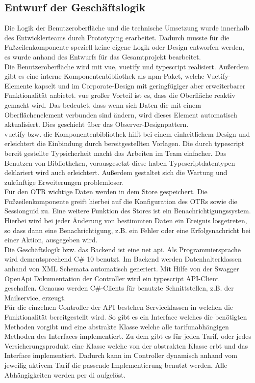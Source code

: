 \subsection{Entwurf der Geschäftslogik}
\label{geschaeftslogik}
Die Logik der Benutzeroberfläche und die technische Umsetzung wurde innerhalb des Entwicklerteams durch Prototyping erarbeitet.
Dadurch musste für die Fußzeilenkomponente speziell keine eigene Logik oder Design entworfen werden, es wurde anhand des Entwurfs für das Gesamtprojekt bearbeitet.\\
Die Benutzeroberfläche wird mit \gls{vue}, \gls{vuetify} und \gls{typescript} realisiert. Außerdem gibt es eine interne Komponentenbibliothek als \gls{npm}-Paket, welche Vuetify-Elemente kapselt und im Corporate-Design mit geringfügiger aber erweiterbarer Funktionalität anbietet. \gls{vue} großer Vorteil ist es, dass die Oberfläche reaktiv gemacht wird. Das bedeutet, dass wenn sich Daten die mit einem Oberflächenelement verbunden sind ändern, wird dieses Element automatisch aktualisiert. Dies geschieht über das Observer-Designpattern.\\
 \gls{vuetify} bzw. die Komponentenbibliothek hilft bei einem einheitlichem Design und erleichtert die Einbindung durch bereitgestellten Vorlagen. Die durch \gls{typescript} bereit gestellte Typsicherheit macht das Arbeiten im Team einfacher. Das Benutzen von Bibliotheken, vorausgesetzt diese haben Typescriptdatentypen deklariert wird auch erleichtert. Außerdem gestaltet sich die Wartung und zukünftige Erweiterungen problemloser.\\
Für den \ac{OTR} wichtige Daten werden in dem Store gespeichert. Die Fußzeilenkomponente greift hierbei auf die Konfiguration des \ac{OTR}s sowie die Sessionguid zu.
Eine weitere Funktion des Stores ist ein Benachrichtigungssystem. Hierbei wird bei jeder Änderung von bestimmten Daten ein Ereignis losgetreten, so dass dann eine Benachrichtigung, z.B. ein Fehler oder eine Erfolgsnachricht bei einer Aktion, ausgegeben wird.\\

Die Geschäftslogik bzw. das Backend ist eine \gls{net} \gls{api}. Als Programmiersprache wird dementsprechend C\# 10 benutzt.
Im Backend werden Datenhalterklassen anhand von XML Schemata automatisch generiert. Mit Hilfe von der Swagger OpenApi Dokumentation der Controller wird ein \gls{typescript} API-Client geschaffen. Genauso werden C\#-Clients für benutzte Schnittstellen, z.B. der Mailservice, erzeugt.\\
Für die einzelnen Controller der API bestehen Serviceklassen in welchen die Funktionalität bereitgestellt wird. So gibt es ein Interface welches die benötigten Methoden vorgibt und eine abstrakte Klasse welche alle tarifunabhängigen Methoden des Interfaces implementiert. Zu dem gibt es für jeden Tarif, oder jedes Versicherungsprodukt eine Klasse welche von der abstrakten Klasse erbt und das Interface implementiert. Dadurch kann im Controller dynamisch anhand vom jeweilig aktivem Tarif die passende Implementierung benutzt werden. %
Alle Abhängigkeiten werden per \gls{di} aufgelöst.
